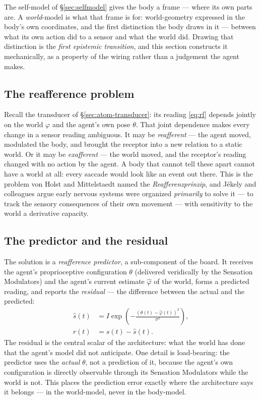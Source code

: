 \documentclass{article}
\begin{document}
The self-model of \S\ref{sec:selfmodel} gives the body a frame --- where
its own parts are.  A \emph{world}-model is what that frame is for:
world-geometry expressed in the body's own coordinates, and the first
distinction the body draws in it --- between what its own action did to a
sensor and what the world did.  Drawing that distinction is the
\emph{first epistemic transition}, and this section constructs it
mechanically, as a property of the wiring rather than a judgement the
agent makes.

\subsection{The reafference problem}\label{sec:world-reaff}

Recall the transducer of \S\ref{sec:atom-transducer}: its reading
\eqref{eq:rf} depends jointly on the world $\varphi$ and the agent's own
pose $\theta$.  That joint dependence makes every change in a sensor
reading ambiguous.  It may be \emph{reafferent} --- the agent moved,
modulated the body, and brought the receptor into a new relation to a
static world.  Or it may be \emph{exafferent} --- the world moved, and
the receptor's reading changed with no action by the agent.  A body that
cannot tell these apart cannot have a world at all: every saccade would
look like an event out there.  This is the problem von Holst and
Mittelstaedt \citep{vonHolstMittelstaedt1950} named the
\emph{Reafferenzprinzip}, and J\'ekely and colleagues
\citep{Jekely2021ReafferenceSelf} argue early nervous systems were
organized \emph{primarily} to solve it --- to track the sensory
consequences of their own movement --- with sensitivity to the world a
derivative capacity.

\subsection{The predictor and the residual}\label{sec:world-residual}

The solution is a \emph{reafference predictor}, a sub-component of the
board.  It receives the agent's proprioceptive configuration $\theta$
(delivered veridically by the Sensation Modulators) and the agent's
current estimate $\hat\varphi$ of the world, forms a predicted reading,
and reports the \emph{residual} --- the difference between the actual and
the predicted:
\begin{align}
\hat s(t) &= I\exp\!\left(-\frac{(\theta(t)-\hat\varphi(t))^2}{\sigma^2}\right),
\label{eq:predicted}\\
r(t) &= s(t) - \hat s(t).
\label{eq:residual}
\end{align}
The residual is the central scalar of the architecture: what the world
has done that the agent's model did not anticipate.  One detail is
load-bearing: the predictor uses the \emph{actual} $\theta$, not a
prediction of it, because the agent's own configuration is directly
observable through its Sensation Modulators while the world is not.  This
places the prediction error exactly where the architecture says it
belongs --- in the world-model, never in the body-model.
\end{document}
